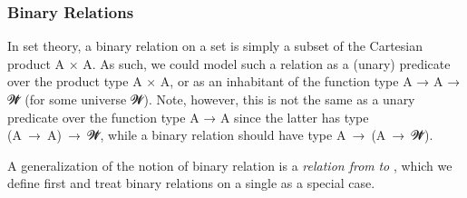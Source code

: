 \subsubsection{Binary Relations}\label{sec:binary-relations}
In set theory, a binary relation on a set  is simply a subset of the Cartesian product \ab A × \ab A. As such, we could model such a relation as a (unary) predicate over the product type \ab A \af × \ab A, or as an inhabitant of the function type \ab A \as → \ab A \as → \ab 𝓦\af ̇ (for some universe \ab 𝓦).  Note, however, this is not the same as a unary predicate over the function type \ab A \as → \ab A since the latter has type  (\ab A~\as →~\ab A)~\as →~\ab 𝓦\af ̇, while a binary relation should have type \ab A~\as →~(\ab A~\as →~\ab 𝓦\af ̇). 

A generalization of the notion of binary relation is a \emph{relation from}  \emph{to} , which we define first and treat binary relations on a single  as a special case.
\ccpad
\begin{code}
\>[1]\AgdaSpace{}%
\AgdaSymbol{:}\AgdaSpace{}%
%
\AgdaSpace{}%
\AgdaSpace{}%
%
\AgdaSpace{}%
\AgdaSpace{}%
\AgdaSymbol{(}\AgdaSpace{}%
\AgdaSymbol{:}\AgdaSpace{}%
\AgdaSymbol{)}\AgdaSpace{}%
\AgdaSpace{}%
\AgdaSpace{}%
\AgdaSpace{}%
\AgdaSpace{}%
\AgdaSpace{}%
\AgdaSpace{}%
\AgdaSpace{}%
\<%
\\
%
\>[1]\AgdaSpace{}%
\AgdaSpace{}%
\AgdaSpace{}%
\AgdaSpace{}%
\AgdaSymbol{=}\AgdaSpace{}%
\AgdaSpace{}%
\AgdaSpace{}%
\AgdaSpace{}%
\AgdaSpace{}%
%
\<%
\\
%
\\[\AgdaEmptyExtraSkip]%
%
\>[1]\AgdaSpace{}%
\AgdaSymbol{:}\AgdaSpace{}%
%
\AgdaSpace{}%
\AgdaSpace{}%
\AgdaSymbol{(}\AgdaSpace{}%
\AgdaSymbol{:}\AgdaSpace{}%
\AgdaSymbol{)}\AgdaSpace{}%
\AgdaSpace{}%
\AgdaSpace{}%
\AgdaSpace{}%
\AgdaSpace{}%
%
\<%
\\
%
\>[1]\AgdaSpace{}%
\AgdaSpace{}%
\AgdaSpace{}%
\AgdaSymbol{=}\AgdaSpace{}%
\AgdaSpace{}%
\AgdaSpace{}%
\AgdaSpace{}%
\<%
\end{code}

